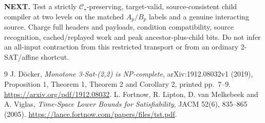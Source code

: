 \documentclass[11pt]{article}
\newcommand{\CS}{\mathcal C_{\star}}
\begin{document}
\textbf{NEXT.} Test a strictly \(\CS\)-preserving, target-valid, source-consistent child compiler at two levels on the matched \(A_p/B_p\) labels and a genuine interacting source. Charge full headers and payloads, condition compatibility, source recognition, cached/replayed work and peak ancestor-plus-child bits. Do not infer an all-input contraction from this restricted transport or from an ordinary 2-SAT/affine shortcut.

\begin{thebibliography}{9}
 J. D\"ocker, \emph{Monotone 3-Sat-(2,2) is NP-complete}, arXiv:1912.08032v1 (2019), Proposition 1, Theorem 1, Theorem 2 and Corollary 2, printed pp.~7--9. \url{https://arxiv.org/pdf/1912.08032}.
 L. Fortnow, R. Lipton, D. van Melkebeek and A. Viglas, \emph{Time-Space Lower Bounds for Satisfiability}, JACM 52(6), 835--865 (2005). \url{https://lance.fortnow.com/papers/files/tst.pdf}.
\end{thebibliography}
\end{document}
